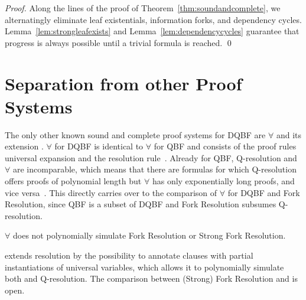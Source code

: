 \documentclass{svjour3}
\begin{document}
\begin{proof}
Along the lines of the proof of Theorem~\ref{thm:soundandcomplete}, we alternatingly eliminate leaf existentials, information forks, and dependency cycles.
Lemma~\ref{lem:strongleafexists} and Lemma~\ref{lem:dependencycycles} guarantee that progress is always possible until a trivial formula is reached.
\qed
\end{proof}


\section{Separation from other Proof Systems}
\label{sect:separation}

The only other known sound and complete proof systems for DQBF are $\forall${} and its extension {}. 
$\forall${} for DQBF is identical to $\forall${} for QBF and consists of the proof rules universal expansion and the resolution rule~\cite{BeyersdorffChewSchmidtSuda/2016/LiftingQBFResolutionCalculitoDQBF}. 
Already for QBF, Q-resolution and $\forall${} are incomparable, which means that there are formulas for which Q-resolution offers proofs of polynomial length but $\forall${} has only exponentially long proofs, and vice versa~\cite{Janota2015expansion}. 
This directly carries over to the comparison of $\forall${} for DQBF and Fork Resolution, since QBF is a subset of DQBF and Fork Resolution subsumes Q-resolution.

\begin{theorem}
$\forall${} does not polynomially simulate Fork Resolution or Strong Fork Resolution.
\end{theorem}

{} extends resolution by the possibility to annotate clauses with partial instantiations of universal variables, which allows it to polynomially simulate both {} and Q-resolution. 
The comparison between (Strong) Fork Resolution and {} is open. 


%
\end{document}
